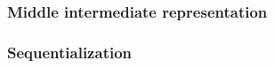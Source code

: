\documentclass[index.tex]{subfiles}
\begin{document}
\subsubsection{Middle intermediate representation}
\label{sec:mir}

\subsubsection{Sequentialization}
\label{sec:sequentialization}
\end{document}
